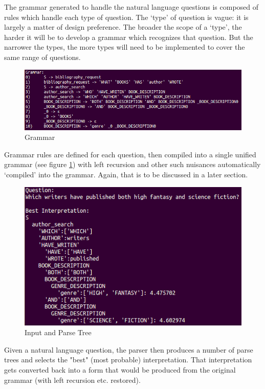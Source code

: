 \documentclass[11pt]{article}
\begin{document}
The grammar generated to handle the natural language questions
is composed of rules which handle each type of question.
The `type' of question is vague: it is largely a matter of design preference.
The broader the scope of a `type', the harder it will be to develop a grammar
which recognizes that question. But the narrower the types, the more types
will need to be implemented to cover the same range of questions.

\begin{figure}[h!]
    \centering
    \includegraphics[width=1\textwidth,natwidth=1,natheight=1]{imgs/demo/grammar.png}
    \caption{Grammar}
    \label{fig:grammar}
\end{figure}

Grammar rules are defined for each question, then compiled into a single
unified grammar (see figure \ref{fig:grammar}) with left recursion and other such 
nuisances automatically `compiled' into the grammar. 
Again, that is to be discussed in a later section.

\begin{figure}[h!]
    \centering
    \includegraphics[scale=1.0,natwidth=1,natheight=1]{imgs/demo/parse.png}
    \caption{Input and Parse Tree}
    \label{fig:parse}
\end{figure}

Given a natural language question, the parser then produces a number of
parse trees and selects the "best" (most probable) interpretation. That
interpretation gets converted back into a form that would be produced from the
original grammar (with left recursion etc. restored).
\end{document}

